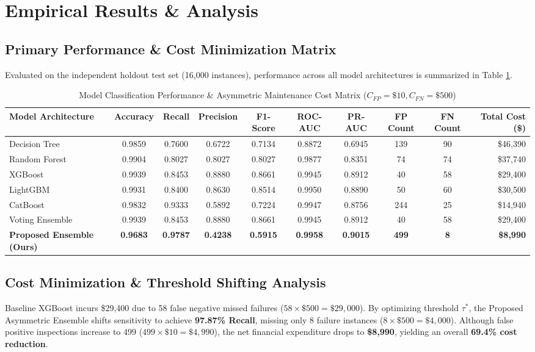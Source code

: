 \documentclass[journal]{IEEEtran}
\begin{document}
\section{Empirical Results \& Analysis}

\subsection{Primary Performance \& Cost Minimization Matrix}
Evaluated on the independent holdout test set (16,000 instances), performance across all model architectures is summarized in Table \ref{tab:model_comparison}.

\begin{table}[t]
\caption{Model Classification Performance \& Asymmetric Maintenance Cost Matrix ($C_{FP}=\$10, C_{FN}=\$500$)}
\label{tab:model_comparison}
\centering
\begin{tabular}{lccccccccr}
\toprule
\textbf{Model Architecture} & \textbf{Accuracy} & \textbf{Recall} & \textbf{Precision} & \textbf{F1-Score} & \textbf{ROC-AUC} & \textbf{PR-AUC} & \textbf{FP Count} & \textbf{FN Count} & \textbf{Total Cost (\$)} \\
\midrule
Decision Tree & 0.9859 & 0.7600 & 0.6722 & 0.7134 & 0.8872 & 0.6945 & 139 & 90 & \$46,390 \\
Random Forest & 0.9904 & 0.8027 & 0.8027 & 0.8027 & 0.9877 & 0.8351 & 74 & 74 & \$37,740 \\
XGBoost & 0.9939 & 0.8453 & 0.8880 & 0.8661 & 0.9945 & 0.8912 & 40 & 58 & \$29,400 \\
LightGBM & 0.9931 & 0.8400 & 0.8630 & 0.8514 & 0.9950 & 0.8890 & 50 & 60 & \$30,500 \\
CatBoost & 0.9832 & 0.9333 & 0.5892 & 0.7224 & 0.9947 & 0.8756 & 244 & 25 & \$14,940 \\
Voting Ensemble & 0.9939 & 0.8453 & 0.8880 & 0.8661 & 0.9945 & 0.8912 & 40 & 58 & \$29,400 \\
\textbf{Proposed Ensemble (Ours)} & \textbf{0.9683} & \textbf{0.9787} & \textbf{0.4238} & \textbf{0.5915} & \textbf{0.9958} & \textbf{0.9015} & \textbf{499} & \textbf{8} & \textbf{\$8,990} \\
\bottomrule
\end{tabular}
\end{table}

\subsection{Cost Minimization \& Threshold Shifting Analysis}
Baseline XGBoost incurs \$29,400 due to 58 false negative missed failures ($58 \times \$500 = \$29,000$). By optimizing threshold $\tau^*$, the Proposed Asymmetric Ensemble shifts sensitivity to achieve \textbf{97.87\% Recall}, missing only 8 failure instances ($8 \times \$500 = \$4,000$). Although false positive inspections increase to 499 ($499 \times \$10 = \$4,990$), the net financial expenditure drops to \textbf{\$8,990}, yielding an overall \textbf{69.4\% cost reduction}.
\end{document}
